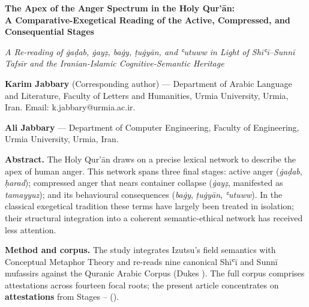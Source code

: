 \documentclass[12pt,a4paper]{article}
\newenvironment{englishabstract}
  {%
    \clearpage
    \begin{LTR}%
    \DefaultMathsDigits
    \englishbody
    \setstretch{1.25}%
    \setlength{\parindent}{0pt}%
    \setlength{\parskip}{0.6em plus 0.2em}%
  }%
  {\end{LTR}}
\begin{document}
\begin{englishabstract}

\begin{center}
{\Large\bfseries The Apex of the Anger Spectrum in the Holy Qur’ān:\\
A Comparative-Exegetical Reading of the Active, Compressed, and Consequential Stages\par}
\vspace{6pt}
{\itshape A Re-reading of ġaḍab, ġayẓ, baġy, ṭuġyān, and ʿutuww in Light of Shīʿī–Sunnī Tafsīr and the Iranian-Islamic Cognitive-Semantic Heritage\par}
\end{center}

\vspace{6pt}

\textbf{Karim Jabbary} (Corresponding author) — Department of Arabic Language and Literature, Faculty of Letters and Humanities, Urmia University, Urmia, Iran. Email: k.jabbary@urmia.ac.ir.

\textbf{Ali Jabbary} — Department of Computer Engineering, Faculty of Engineering, Urmia University, Urmia, Iran.

\vspace{8pt}

\noindent\textbf{Abstract.} The Holy Qur’ān draws on a precise lexical network to describe the apex of human anger. This network spans three final stages: active anger (\textit{ġaḍab}, \textit{ḥarad}); compressed anger that nears container collapse (\textit{ġayẓ}, manifested as \textit{tamayyuz}); and its behavioural consequences (\textit{baġy}, \textit{ṭuġyān}, \textit{ʿutuww}). In the classical exegetical tradition these terms have largely been treated in isolation; their structural integration into a coherent semantic-ethical network has received less attention.

\noindent\textbf{Method and corpus.} The study integrates Izutsu’s field semantics with Conceptual Metaphor Theory and re-reads nine canonical Shīʿī and Sunnī mufassirs against the Quranic Arabic Corpus (Dukes ). The full corpus comprises  attestations across fourteen focal roots; the present article concentrates on \textbf{ attestations} from Stages – ().


\end{englishabstract}
\end{document}
